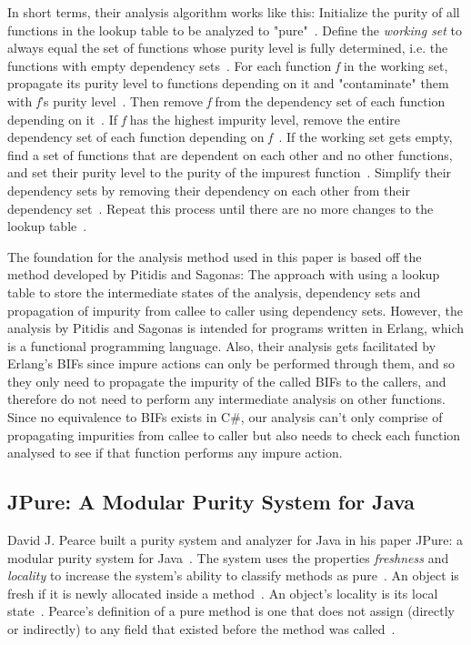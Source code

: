 \documentclass[a4paper,12pt]{article}
\begin{document}
In short terms, their analysis algorithm works like this: Initialize the purity of all functions in the lookup table to be analyzed to "pure"~\cite{pitidis2010purity}. Define the \textit{working set} to always equal the set of functions whose purity level is fully determined, i.e. the functions with empty dependency sets~\cite{pitidis2010purity}. For each function \textit{f} in the working set, propagate its purity level to functions depending on it and "contaminate" them with \textit{f}'s purity level~\cite{pitidis2010purity}. Then remove \textit{f} from the  dependency set of each function depending on it~\cite{pitidis2010purity}. If \textit{f} has the highest impurity level, remove the entire dependency set of each function depending on \textit{f}~\cite{pitidis2010purity}. If the working set gets empty, find a set of functions that are dependent on each other and no other functions, and set their purity level to the purity of the impurest function~\cite{pitidis2010purity}. Simplify their dependency sets by removing their dependency on each other from their dependency set~\cite{pitidis2010purity}. Repeat this process until there are no more changes to the lookup table~\cite{pitidis2010purity}.

The foundation for the analysis method used in this paper is based off the method developed by Pitidis and Sagonas: The approach with using a lookup table to store the intermediate states of the analysis, dependency sets and propagation of impurity from callee to caller using dependency sets. However, the analysis by Pitidis and Sagonas is intended for programs written in Erlang, which is a functional programming language. Also, their analysis gets facilitated by Erlang's BIFs since impure actions can only be performed through them, and so they only need to propagate the impurity of the called BIFs to the callers, and therefore do not need to perform any intermediate analysis on other functions. Since no equivalence to BIFs exists in C\#, our analysis can't only comprise of propagating impurities from callee to caller but also needs to check each function analysed to see if that function performs any impure action.

\subsection{JPure: A Modular Purity System for Java} \label{sub:JPure: A Modular Purity System for Java}

David J. Pearce built a purity system and analyzer for Java in his paper JPure: a modular purity system for Java~\cite{pearce2011jpure}. The system uses the properties \textit{freshness} and \textit{locality} to increase the system's ability to classify methods as pure~\cite{pearce2011jpure}. An object is fresh if it is newly allocated inside a method~\cite{pearce2011jpure}. An object's locality is its local state~\cite{pearce2011jpure}. Pearce's definition of a pure method is one that does not assign (directly or indirectly) to any field that existed before the method was called~\cite{pearce2011jpure}.
\end{document}
